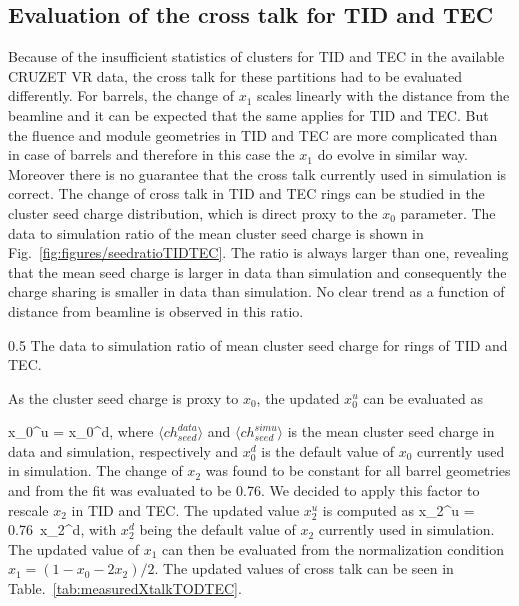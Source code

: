 \subsection{Evaluation of the cross talk for TID and TEC}



Because of the insufficient statistics of clusters for TID and TEC in the available CRUZET VR data, the cross talk for these partitions had to be evaluated differently. For barrels, the change of $x_{1}$ scales linearly with the distance from the beamline and it can be expected that the same applies for TID and TEC. But the fluence and module geometries in TID and TEC are more complicated than in case of barrels and therefore in this case the $x_{1}$ do evolve in similar way. Moreover there is no guarantee that the cross talk currently used in simulation is correct.  The change of cross talk in TID and TEC rings can be studied in the cluster seed charge distribution, which is direct proxy to the $x_{0}$ parameter. The data to simulation ratio of the mean cluster seed charge is shown in Fig.~\ref{fig:figures/seedratioTIDTEC}. The ratio is always larger than one, revealing that the mean seed charge is larger in data than simulation and consequently the charge sharing is smaller in data than simulation. No clear trend as a function of distance from beamline is observed in this ratio.

                 {0.5}       %
                 {The data to simulation ratio of mean cluster seed charge for rings of TID and TEC.}

As the cluster seed charge is proxy to $x_{0}$, the updated $x_{0}^{u}$ can be evaluated as

{
x_{0}^{u} = x_{0}^{d},
}
where $\langle ch_{seed}^{data} \rangle$ and $\langle ch_{seed}^{simu} \rangle$ is the mean cluster seed charge in data and simulation, respectively and $x_{0}^{d}$ is the default value of $x_{0}$ currently used in simulation. The change of $x_{2}$ was found to be constant for all barrel geometries and from the fit was evaluated to be 0.76. We decided to apply this factor to rescale $x_{2}$ in TID and TEC. The updated value $x_{2}^{u}$ is computed as 
{
x_{2}^{u} = 0.76~x_{2}^{d},
}
with  $x_{2}^{d}$ being the default value of $x_{2}$ currently used in simulation. The updated value of $x_{1}$ can then be evaluated from the normalization condition $x_{1} = (1-x_{0}-2x_{2})/2$. The updated values of cross talk can be seen in Table.~\ref{tab:measuredXtalkTODTEC}.

